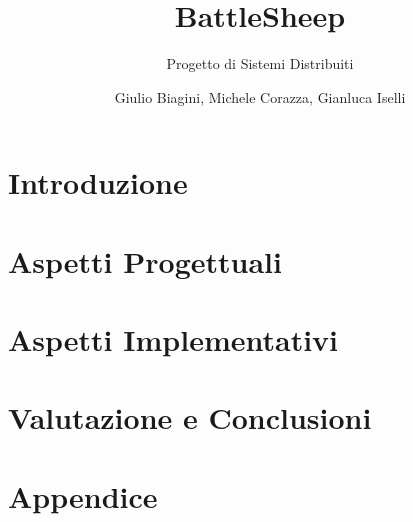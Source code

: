 \documentclass[a4paper,10pt]{scrartcl}
\begin{document}
\title{BattleSheep}
\subtitle{Progetto di Sistemi Distribuiti}
\author{Giulio Biagini, Michele Corazza, Gianluca Iselli}
\maketitle

\begin{abstract}

\end{abstract}

\section{Introduzione}


\section{Aspetti Progettuali}




\section{Aspetti Implementativi}

%



\section{Valutazione e Conclusioni}


\newpage

\section{Appendice}
\end{document}
